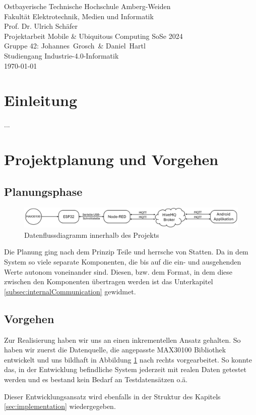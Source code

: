\documentclass[12pt,oneside]{article}
\newcommand*{\IhrVornameEins}{Johannes}
\newcommand*{\IhrNachnameEins}{Grosch}
\newcommand*{\IhrVornameZwei}{Daniel}
\newcommand*{\IhrNachnameZwei}{Hartl}
\newcommand*{\IhreGruppe}{Gruppe 42}
\newcommand*{\IhrStudiengang}{Industrie-4.0-Informatik}
\newcommand*{\IhreArbeit}{Projektarbeit Mobile \& Ubiquitous Computing SoSe 2024}
\newcommand*{\IhrErstpruefer}{Prof. Dr. Ulrich Schäfer}
\newcommand{\quoteM}[1]{\glqq {#1}\grqq{} }
\begin{document}
  \thispagestyle{empty}
  \originalTeX
  \begin{center}
 	\Large
 	Ostbayerische Technische Hochschule Amberg-Weiden\\
 Fakultät Elektrotechnik, Medien und Informatik\\[.8cm]
 \large \IhrErstpruefer\\[.8cm]
 \Large \IhreArbeit\\[.8cm]
 \large \IhreGruppe: \IhrVornameEins\ \IhrNachnameEins\ \&
 \IhrVornameZwei\ \IhrNachnameZwei\\[.8cm]
 \large Studiengang \IhrStudiengang\\[.8cm]
 \today\\[2.5cm]
  \end{center}
  
  \tableofcontents

  \clearpage
  
  
  \section{Einleitung}
	...


  
  \section{Projektplanung und Vorgehen}
  \subsection{Planungsphase}
	\begin{figure}[tph!]
	 	\includegraphics[width=\textwidth]{kommunikationsdiagramm}
	 	\caption{Datenflussdiagramm innerhalb des Projekts}
	 	\label{fig:datadiagram}
	\end{figure}
	Die Planung ging nach dem Prinzip \quoteM{Divide et impera} Teile und herrsche von Statten. Da in dem System so viele separate Komponenten, die bis auf die ein- und ausgehenden Werte autonom voneinander sind. Diesen, bzw. dem Format, in dem diese zwischen den Komponenten übertragen werden ist das Unterkapitel \ref{subsec:internalCommunication} gewidmet.
  \subsection{Vorgehen}
	Zur Realisierung haben wir uns an einen inkrementellen Ansatz gehalten. So haben wir zuerst die Datenquelle, die angepasste MAX30100 Bibliothek entwickelt und uns bildhaft in Abbildung \ref{fig:datadiagram} nach rechts vorgearbeitet. So konnte das, in der Entwicklung befindliche System jederzeit mit realen Daten getestet werden und es bestand kein Bedarf an Testdatensätzen o.ä.\par
	Dieser Entwicklungsansatz wird ebenfalls in der Struktur des Kapitels \ref{sec:implementation} wiedergegeben.
\end{document}
